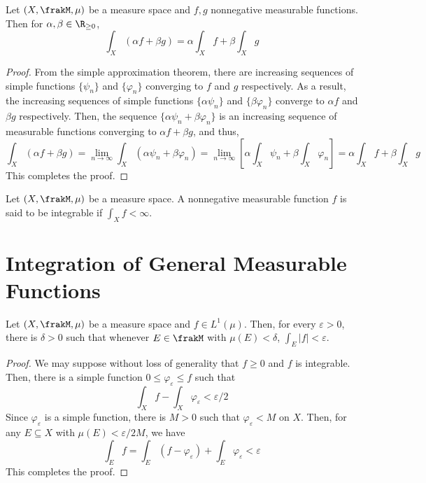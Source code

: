 \begin{proposition}
    Let $(X,\frakM,\mu)$ be a measure space and $f,g$ nonnegative measurable functions. Then for $\alpha,\beta\in\R_{\ge0}$, 
    \begin{equation*}
        \int_X(\alpha f + \beta g) = \alpha\int_X f + \beta\int_X g
    \end{equation*}
\end{proposition}
\begin{proof}
    From the simple approximation theorem, there are increasing sequences of simple functions $\{\psi_n\}$ and $\{\varphi_n\}$ converging to $f$ and $g$ respectively. As a result, the increasing sequences of simple functions $\{\alpha\psi_n\}$ and $\{\beta\varphi_n\}$ converge to $\alpha f$ and $\beta g$ respectively. Then, the sequence $\{\alpha\psi_n + \beta\varphi_n\}$ is an increasing sequence of measurable functions converging to $\alpha f + \beta g$, and thus,
    \begin{equation*}
        \int_X(\alpha f + \beta g) = \lim_{n\to\infty}\int_X(\alpha\psi_n + \beta\varphi_n) = \lim_{n\to\infty}\left[\alpha\int_X\psi_n + \beta\int_X\varphi_n\right] = \alpha\int_X f + \beta\int_X g
    \end{equation*}
    This completes the proof.
\end{proof}

\begin{definition}[Integrable]
    Let $(X,\frakM,\mu)$ be a measure space. A nonnegative measurable function $f$ is said to be integrable if $\int_X f < \infty$.
\end{definition}

\section{Integration of General Measurable Functions}

\begin{proposition}
    Let $(X,\frakM,\mu)$ be a measure space and $f\in L^1(\mu)$. Then, for every $\varepsilon > 0$, there is $\delta > 0$ such that whenever $E\in\frakM$ with $\mu(E) < \delta$, $\displaystyle\int_E|f| < \varepsilon$.
\end{proposition}
\begin{proof}
    We may suppose without loss of generality that $f\ge 0$ and $f$ is integrable. Then, there is a simple function $0\le\varphi_\varepsilon\le f$ such that 
    \begin{equation*}
        \int_X f - \int_X\varphi_\varepsilon < \varepsilon/2
    \end{equation*}
    Since $\varphi_\varepsilon$ is a simple function, there is $M > 0$ such that $\varphi_\varepsilon < M$ on $X$. Then, for any $E\subseteq X$ with $\mu(E) < \varepsilon/2M$, we have 
    \begin{equation*}
        \int_E f = \int_E(f - \varphi_\varepsilon) + \int_E\varphi_\varepsilon < \varepsilon
    \end{equation*}
    This completes the proof.
\end{proof}